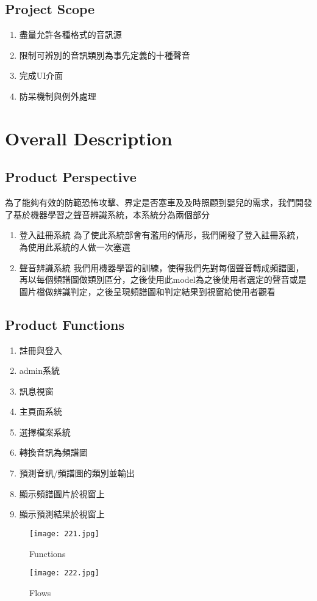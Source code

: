 \documentclass{scrreprt}
\begin{document}
\begin{CJK*}{UTF8}{bsmi}
\section{Project Scope}
\begin{enumerate}
\item 盡量允許各種格式的音訊源
\item 限制可辨別的音訊類別為事先定義的十種聲音
\item 完成UI介面
\item 防呆機制與例外處理
\end{enumerate}



\chapter{Overall Description}

\section{Product Perspective}
為了能夠有效的防範恐怖攻擊、界定是否塞車及及時照顧到嬰兒的需求，我們開發了基於機器學習之聲音辨識系統，本系統分為兩個部分
\begin{enumerate}
\item 登入註冊系統 為了使此系統部會有濫用的情形，我們開發了登入註冊系統，為使用此系統的人做一次塞選
\item 聲音辨識系統 我們用機器學習的訓練，使得我們先對每個聲音轉成頻譜圖，再以每個頻譜圖做類別區分，之後使用此model為之後使用者選定的聲音或是圖片檔做辨識判定，之後呈現頻譜圖和判定結果到視窗給使用者觀看

\end{enumerate}

\section{Product Functions}
\begin{enumerate}
\item 註冊與登入
\item admin系統
\item 訊息視窗
\item 主頁面系統
\item 選擇檔案系統
\item 轉換音訊為頻譜圖
\item 預測音訊/頻譜圖的類別並輸出
\item 顯示頻譜圖片於視窗上
\item 顯示預測結果於視窗上
\end{enumerate}
\begin{figure} [h]
\centering
\texttt{[image: 221.jpg]}
\caption{Functions}
\end{figure}
\begin{figure} [h]
\centering
\texttt{[image: 222.jpg]}
\caption{Flows}
\end{figure}

\end{CJK*}
\end{document}
